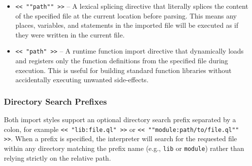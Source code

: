 \begin{itemize}
    \item \texttt{<< \texttt{""path""} >>} -- A lexical splicing directive that literally splices the content of the specified file at the current location before parsing. This means any places, variables, and statements in the imported file will be executed as if they were written in the current file.
    \item \texttt{<< \texttt{"path"} >>} -- A runtime function import directive that dynamically loads and registers only the function definitions from the specified file during execution. This is useful for building standard function libraries without accidentally executing unwanted side-effects.
\end{itemize}

\subsubsection{Directory Search Prefixes}
Both import styles support an optional directory search prefix separated by a colon, for example \texttt{<< "lib:file.ql" >>} or \texttt{<< ""module:path/to/file.ql"" >>}. When a prefix is specified, the interpreter will search for the requested file within any directory matching the prefix name (e.g., \texttt{lib} or \texttt{module}) rather than relying strictly on the relative path.

